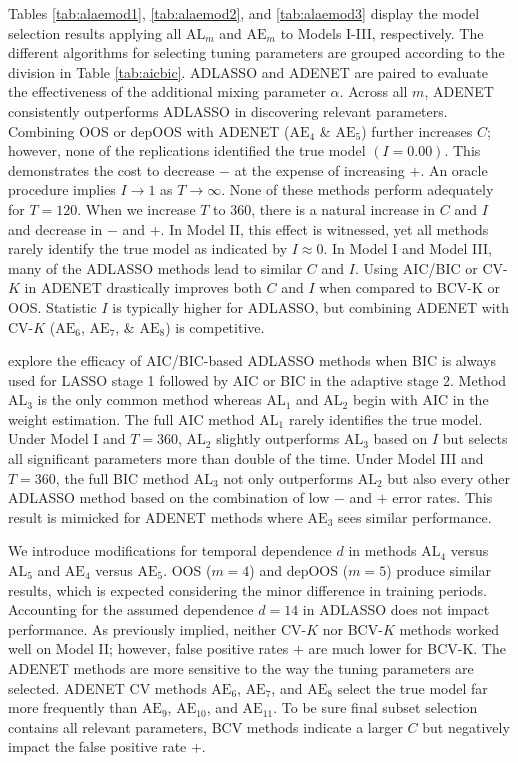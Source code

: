 Tables \ref{tab:alaemod1}, \ref{tab:alaemod2}, and \ref{tab:alaemod3} display the model selection results applying all $\textrm{AL}_m$ and $\textrm{AE}_m$ to Models I-III, respectively. The different algorithms for selecting tuning parameters are grouped according to the division in Table \ref{tab:aicbic}. ADLASSO and ADENET are paired to evaluate the effectiveness of the additional mixing parameter $\alpha$. Across all $m$, ADENET consistently outperforms ADLASSO in discovering relevant parameters. Combining OOS or depOOS with ADENET ($\textrm{AE}_4$ \& $\textrm{AE}_5$) further increases $C$; however, none of the replications identified the true model $(I=0.00)$. This demonstrates the cost to decrease $-$ at the expense of increasing $+$. An oracle procedure implies $I\to 1$ as $T\to\infty$. None of these methods perform adequately for $T=120$. When we increase $T$ to 360, there is a natural increase in $C$ and $I$ and decrease in $-$ and $+$. In Model II, this effect is witnessed, yet all methods rarely identify the true model as indicated by $I \approx 0$. In Model I and Model III, many of the ADLASSO methods lead to similar $C$ and $I$.  Using AIC/BIC or CV-$K$ in ADENET drastically improves both $C$ and $I$ when compared to BCV-K or OOS. Statistic $I$ is typically higher for ADLASSO, but combining ADENET with CV-$K$ ($\textrm{AE}_6$, $\textrm{AE}_7$, \& $\textrm{AE}_8$) is competitive.

\cite{Chen2011} explore the efficacy of AIC/BIC-based ADLASSO methods when BIC is always used for LASSO stage 1 followed by AIC or BIC in the adaptive stage 2. Method $\textrm{AL}_3$ is the only common method whereas $\textrm{AL}_1$ and $\textrm{AL}_2$ begin with AIC in the weight estimation. The full AIC method $\textrm{AL}_1$ rarely identifies the true model. Under Model I and $T=360$, $\textrm{AL}_2$ slightly outperforms $\textrm{AL}_3$ based on $I$ but selects all significant parameters more than double of the time. Under Model III and $T=360$, the full BIC method $\textrm{AL}_3$ not only outperforms $\textrm{AL}_2$ but also every other ADLASSO method based on the combination of low $-$ and $+$ error rates. This result is mimicked for ADENET methods where $\textrm{AE}_3$ sees similar performance.

We introduce modifications for temporal dependence $d$ in methods $\textrm{AL}_4$ versus $\textrm{AL}_5$ and $\textrm{AE}_4$ versus $\textrm{AE}_5$. OOS ($m=4$) and depOOS ($m=5$) produce similar results, which is expected considering the minor difference in training periods. Accounting for the assumed dependence $d=14$ in ADLASSO does not impact performance. As previously implied, neither CV-$K$ nor BCV-$K$ methods worked well on Model II; however,  false positive rates $+$ are much lower for BCV-K. The ADENET methods are more sensitive to the way the tuning parameters are selected. ADENET CV methods $\textrm{AE}_6$, $\textrm{AE}_7$, and $\textrm{AE}_8$ select the true model far more frequently than $\textrm{AE}_9$, $\textrm{AE}_{10}$, and $\textrm{AE}_{11}$. To be sure final subset selection contains all relevant parameters, BCV methods indicate a larger $C$ but negatively impact the false positive rate $+$.


